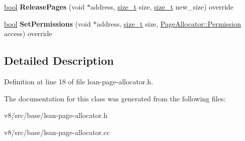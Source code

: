 \begin{DoxyCompactItemize}
\item 
\mbox{\label{classv8_1_1base_1_1LsanPageAllocator_afce0e6b140f92c1866732b13bb1c0694}} 
\mbox{\hyperlink{classbool}{bool}} {\bfseries Release\+Pages} (void $\ast$address, \mbox{\hyperlink{classsize__t}{size\+\_\+t}} size, \mbox{\hyperlink{classsize__t}{size\+\_\+t}} new\+\_\+size) override
\item 
\mbox{\label{classv8_1_1base_1_1LsanPageAllocator_a0f5faf5c47e1176996096134d87ca2b8}} 
\mbox{\hyperlink{classbool}{bool}} {\bfseries Set\+Permissions} (void $\ast$address, \mbox{\hyperlink{classsize__t}{size\+\_\+t}} size, \mbox{\hyperlink{classv8_1_1PageAllocator_a88f74b164fe97e053259f67a95758415}{Page\+Allocator\+::\+Permission}} access) override
\end{DoxyCompactItemize}


\subsection{Detailed Description}


Definition at line 18 of file lsan-\/page-\/allocator.\+h.



The documentation for this class was generated from the following files\+:\begin{DoxyCompactItemize}
\item 
v8/src/base/lsan-\/page-\/allocator.\+h\item 
v8/src/base/lsan-\/page-\/allocator.\+cc\end{DoxyCompactItemize}
